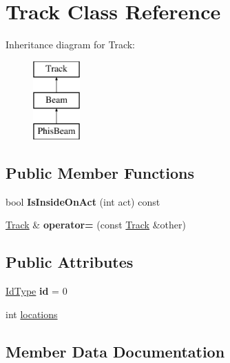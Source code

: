 \hypertarget{class_track}{}\section{Track Class Reference}
\label{class_track}
Inheritance diagram for Track\+:\begin{figure}[H]
\begin{center}
\leavevmode
\includegraphics[height=3.000000cm]{class_track}
\end{center}
\end{figure}
\subsection*{Public Member Functions}
\begin{DoxyCompactItemize}
\item 
\mbox{\label{class_track_a0e023ede0704dab14c1bfbac164a8f73}} 
bool {\bfseries Is\+Inside\+On\+Act} (int act) const
\item 
\mbox{\label{class_track_a5c9b01364289589a2dfaf4a865a88cf1}} 
\mbox{\hyperlink{class_track}{Track}} \& {\bfseries operator=} (const \mbox{\hyperlink{class_track}{Track}} \&other)
\end{DoxyCompactItemize}
\subsection*{Public Attributes}
\begin{DoxyCompactItemize}
\item 
\mbox{\label{class_track_a04d6f364003aa9e8cd212df0dbb2447f}} 
\mbox{\hyperlink{class_big_integer}{Id\+Type}} {\bfseries id} = 0
\item 
int \mbox{\hyperlink{class_track_a9a1bcdb52e5765ac6d91e62f26a51df0}{locations}}
\end{DoxyCompactItemize}


\subsection{Member Data Documentation}
\mbox{\label{class_track_a9a1bcdb52e5765ac6d91e62f26a51df0}} 
